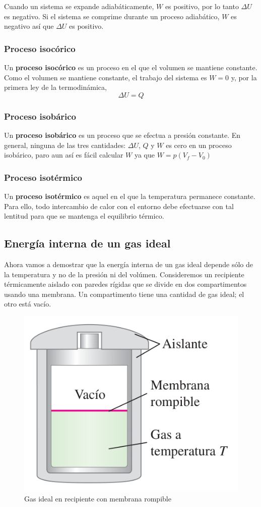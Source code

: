 \documentclass[12pt]{article}
\begin{document}
  Cuando un sistema se expande adiabáticamente, $ W $ es positivo, por lo tanto $ \Delta U $ es negativo. Si el sistema se comprime durante un proceso adiabático, $ W $ es negativo así que $ \Delta U $ es positivo.

  \subsubsection{Proceso isocórico}
  Un \textbf{proceso isocórico} es un proceso en el que el volumen se mantiene constante. Como el volumen se mantiene constante, el trabajo del sistema es $ W = 0 $ y, por la primera ley de la termodinámica, 
  \[
  \Delta U = Q
  \]

  \subsubsection{Proceso isobárico}
  Un \textbf{proceso isobárico} es un proceso que se efectua a presión constante. En general, ninguna de las tres cantidades: $ \Delta U $, $ Q $ y $ W $ es cero en un proceso isobárico, paro aun así es fácil calcular $ W $ ya que 
  $ W = p(V_{f}-V_{0}) $

  \subsubsection{Proceso isotérmico}
  Un \textbf{proceso isotérmico} es aquel en el que la temperatura permanece constante. Para ello, todo intercambio de calor con el entorno debe efectuarse con tal lentitud para que se mantenga el equilibrio térmico. 

  \subsection{Energía interna de un gas ideal}
  Ahora vamos a demostrar que la energía interna de un gas ideal depende sólo de la temperatura y no de la presión ni del volúmen. Consideremos un recipiente térmicamente aislado con paredes rígidas que se divide en dos compartimentos usando una membrana. Un compartimento tiene una cantidad de gas ideal; el otro está vacío. 

  \begin{figure}[H]
    \centering
    \includegraphics[width=0.5\linewidth]{imagenes/expansion-libre-gas-ideal.png}
    \caption{Gas ideal en recipiente con membrana rompible}
    \label{fig:e-int-gas-ideal}
  \end{figure}
  
\end{document}
